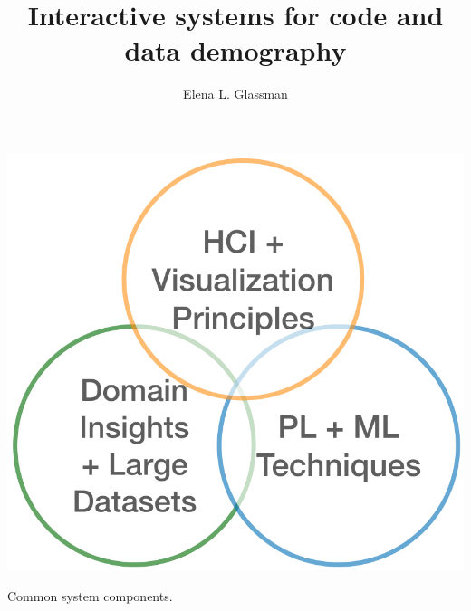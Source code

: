\documentclass[justified]{tufte-handout}
\title{Interactive systems for code and data demography}
\author[Elena L. Glassman]{Elena L. Glassman}
\begin{document}
\fontsize{9pt}{12pt}\selectfont

\maketitle%

\begin{marginfigure}%
  \centering
  \includegraphics[width=0.75\linewidth]{Summary_figure1.png}
  \caption{Common system components.}
  \label{fig:summaryfig1}
  \centering

\end{marginfigure}
\end{document}
